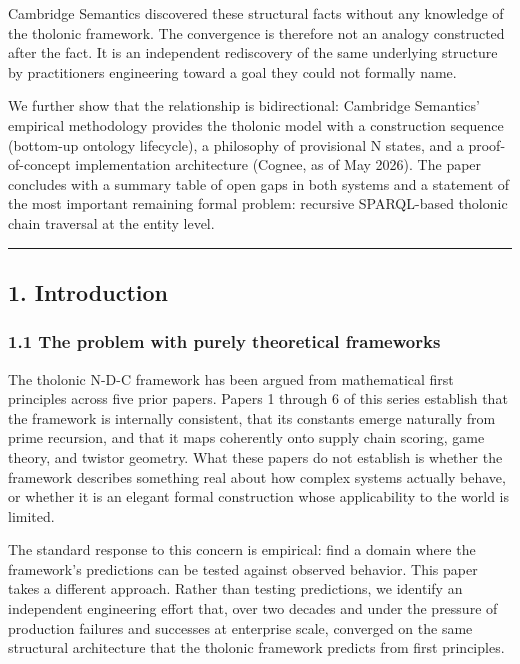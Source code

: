 \documentclass[
  11pt,
  letterpaper,
]{article}
\begin{document}
Cambridge Semantics discovered these structural facts without any
knowledge of the tholonic framework. The convergence is therefore not an
analogy constructed after the fact. It is an independent rediscovery of
the same underlying structure by practitioners engineering toward a goal
they could not formally name.

We further show that the relationship is bidirectional: Cambridge
Semantics' empirical methodology provides the tholonic model with a
construction sequence (bottom-up ontology lifecycle), a philosophy of
provisional N states, and a proof-of-concept implementation architecture
(Cognee, as of May 2026). The paper concludes with a summary table of
open gaps in both systems and a statement of the most important
remaining formal problem: recursive SPARQL-based tholonic chain
traversal at the entity level.

\begin{center}\rule{0.5\linewidth}{0.5pt}\end{center}

\subsection{1. Introduction}\label{introduction}

\subsubsection{1.1 The problem with purely theoretical
frameworks}\label{the-problem-with-purely-theoretical-frameworks}

The tholonic N-D-C framework has been argued from mathematical first
principles across five prior papers. Papers 1 through 6 of this series
establish that the framework is internally consistent, that its
constants emerge naturally from prime recursion, and that it maps
coherently onto supply chain scoring, game theory, and twistor geometry.
What these papers do not establish is whether the framework describes
something real about how complex systems actually behave, or whether it
is an elegant formal construction whose applicability to the world is
limited.

The standard response to this concern is empirical: find a domain where
the framework's predictions can be tested against observed behavior.
This paper takes a different approach. Rather than testing predictions,
we identify an independent engineering effort that, over two decades and
under the pressure of production failures and successes at enterprise
scale, converged on the same structural architecture that the tholonic
framework predicts from first principles.
\end{document}
